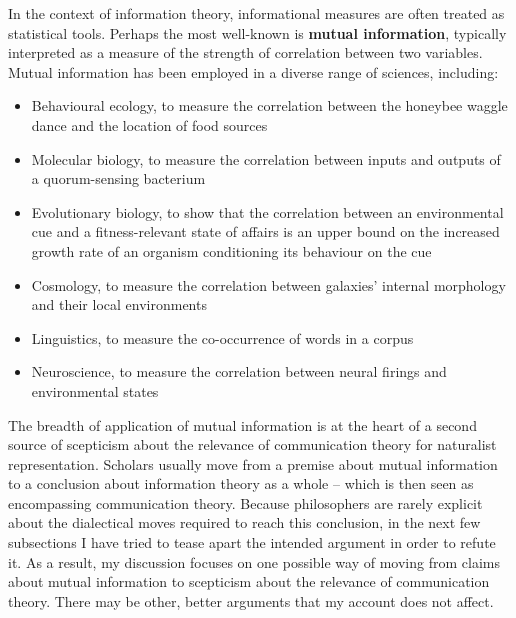 

In the context of information theory, informational measures are often treated as statistical tools.
Perhaps the most well-known is \textbf{mutual information}, typically interpreted as a measure of the strength of correlation between two variables.
Mutual information has been employed in a diverse range of sciences, including:

\begin{itemize}
    \item Behavioural ecology, to measure the correlation between the honeybee waggle dance and the location of food sources \citep{haldane1954statistical}
    \item Molecular biology, to measure the correlation between inputs and outputs of a quorum-sensing bacterium \citep{mehta2009information}
    \item Evolutionary biology, to show that the correlation between an environmental cue and a fitness-relevant state of affairs is an upper bound on the increased growth rate of an organism conditioning its behaviour on the cue \citep{donaldson-matasci2010fitness}
    \item Cosmology, to measure the correlation between galaxies' internal morphology and their local environments \citep{pandey2017how}
    \item Linguistics, to measure the co-occurrence of words in a corpus \citep[$\S$4]{hunston2002corpora}
    \item Neuroscience, to measure the correlation between neural firings and environmental states \citep[][and references therein]{rathkopf2017neural}
\end{itemize}


\noindent The breadth of application of mutual information is at the heart of a second source of scepticism about the relevance of communication theory for naturalist representation.
Scholars usually move from a premise about mutual information to a conclusion about information theory as a whole -- which is then seen as encompassing communication theory.
Because philosophers are rarely explicit about the dialectical moves required to reach this conclusion, in the next few subsections I have tried to tease apart the intended argument in order to refute it.
As a result, my discussion focuses on one possible way of moving from claims about mutual information to scepticism about the relevance of communication theory.
There may be other, better arguments that my account does not affect.

